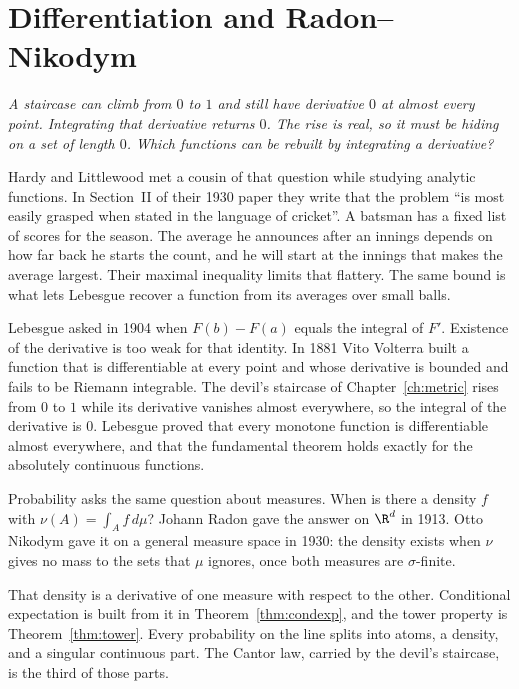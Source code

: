 \chapter{Differentiation and Radon--Nikodym}\label{ch:radon}

\begin{center}\itshape
A staircase can climb from $0$ to $1$ and still have derivative $0$ at almost every point.
Integrating that derivative returns $0$. The rise is real, so it must be hiding on a set of length $0$.
Which functions can be rebuilt by integrating a derivative?
\end{center}

Hardy and Littlewood met a cousin of that question while studying analytic functions. In Section~II of their 1930 paper they write that the problem ``is most easily grasped when stated in the language of cricket''. A batsman has a fixed list of scores for the season. The average he announces after an innings depends on how far back he starts the count, and he will start at the innings that makes the average largest. Their maximal inequality limits that flattery. The same bound is what lets Lebesgue recover a function from its averages over small balls.

Lebesgue asked in 1904 when $F(b)-F(a)$ equals the integral of $F'$. Existence of the derivative is too weak for that identity. In 1881 Vito Volterra built a function that is differentiable at every point and whose derivative is bounded and fails to be Riemann integrable. The devil's staircase of Chapter~\ref{ch:metric} rises from $0$ to $1$ while its derivative vanishes almost everywhere, so the integral of the derivative is $0$. Lebesgue proved that every monotone function is differentiable almost everywhere, and that the fundamental theorem holds exactly for the absolutely continuous functions.

Probability asks the same question about measures. When is there a density $f$ with $\nu(A)=\int_Af\,d\mu$? Johann Radon gave the answer on $\R^d$ in 1913. Otto Nikodym gave it on a general measure space in 1930: the density exists when $\nu$ gives no mass to the sets that $\mu$ ignores, once both measures are $\sigma$-finite.


That density is a derivative of one measure with respect to the other. Conditional expectation is built from it in Theorem~\ref{thm:condexp}, and the tower property is Theorem~\ref{thm:tower}. Every probability on the line splits into atoms, a density, and a singular continuous part. The Cantor law, carried by the devil's staircase, is the third of those parts.

